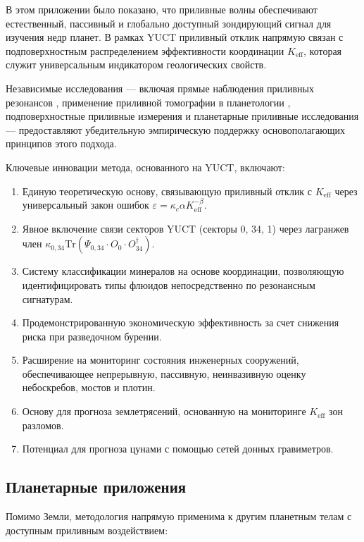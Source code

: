 \documentclass[12pt,a4paper]{article}
\theoremstyle{remark}
\newcommand{\Keff}{K_{\mathrm{eff}}}
\newcommand{\kappac}{\kappa_c}
\newcommand{\eps}{\varepsilon}
\begin{document}
	В этом приложении было показано, что приливные волны обеспечивают естественный, пассивный и глобально доступный зондирующий сигнал для изучения недр планет. В рамках YUCT приливный отклик напрямую связан с подповерхностным распределением эффективности координации $\Keff$, которая служит универсальным индикатором геологических свойств.
	
	Независимые исследования — включая прямые наблюдения приливных резонансов \cite{Sibgatulin2014}, применение приливной томографии в планетологии \cite{RoviraNavarro2025}, подповерхностные приливные измерения \cite{Rogister2024} и планетарные приливные исследования \cite{Briaud2025} — предоставляют убедительную эмпирическую поддержку основополагающих принципов этого подхода.
	
	Ключевые инновации метода, основанного на YUCT, включают:
	
	\begin{enumerate}
		\item Единую теоретическую основу, связывающую приливный отклик с $\Keff$ через универсальный закон ошибок $\eps = \kappac \alpha \Keff^{-\beta}$.
		\item Явное включение связи секторов YUCT (секторы 0, 34, 1) через лагранжев член $\kappa_{0,34} \mathrm{Tr}(\Psi_{0,34} \cdot O_0 \cdot O_{34}^\dagger)$.
		\item Систему классификации минералов на основе координации, позволяющую идентифицировать типы флюидов непосредственно по резонансным сигнатурам.
		\item Продемонстрированную экономическую эффективность за счет снижения риска при разведочном бурении.
		\item Расширение на мониторинг состояния инженерных сооружений, обеспечивающее непрерывную, пассивную, неинвазивную оценку небоскребов, мостов и плотин.
		\item Основу для прогноза землетрясений, основанную на мониторинге \(K_{\mathrm{eff}}\) зон разломов.
		\item Потенциал для прогноза цунами с помощью сетей донных гравиметров.
	\end{enumerate}
	
	\subsection{Планетарные приложения}
	
	Помимо Земли, методология напрямую применима к другим планетным телам с доступным приливным воздействием:
	
\end{document}
